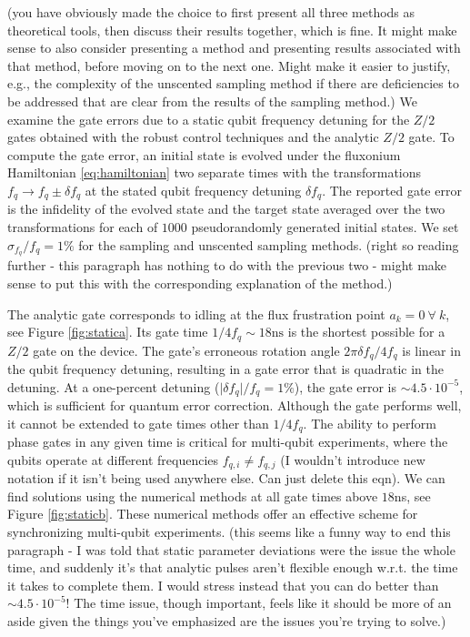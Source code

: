(you have obviously made the choice to first present all three methods as theoretical tools, then discuss their results together, which is fine. It might make sense to also consider presenting a method and presenting results associated with that method, before moving on to the next one. Might make it easier to justify, e.g., the complexity of the unscented sampling method if there are deficiencies to be addressed that are clear from the results of the sampling method.)
We examine the gate errors due to a static qubit frequency
detuning for the $Z/2$ gates obtained with the robust control techniques
and the analytic $Z/2$ gate.
To compute the gate error,
an initial state is evolved
under the fluxonium Hamiltonian \eqref{eq:hamiltonian}
two separate times with the transformations
$f_{q} \rightarrow f_{q} \pm \delta f_{q}$
at the stated qubit frequency detuning $\delta f_{q}$.
The reported gate error is the infidelity of
the evolved state and the target state averaged over
the two transformations for each of $1000$ pseudorandomly
generated initial states.
We set $\sigma_{f_{q}}/f_{q} = 1\%$
for the sampling and unscented sampling
methods.
(right so reading further - this paragraph has nothing to do with the previous two - might make sense to put this with the corresponding explanation of the method.)

The analytic gate corresponds to
idling at the flux frustration point $a_{k} = 0 \ \forall \ k$, see Figure
\ref{fig:statica}. Its gate time $1 / 4 f_{q} \sim 18\textrm{ns}$
is the shortest possible for a $Z/2$ gate on the device.
The gate's erroneous rotation angle
$2 \pi \delta f_{q} / 4 f_{q}$ is linear in the
qubit frequency detuning, resulting in a gate error that is quadratic
in the detuning.
At a one-percent
detuning ($\lvert \delta f_{q} \rvert / f_{q} = 1\%$),
the gate error is $\sim 4.5 \cdot 10^{-5}$,
which is sufficient for quantum error correction.
Although the gate performs well, it cannot be extended
to gate times other than
$1 / 4 f_{q}$. The ability to perform
phase gates in any given time is critical
for multi-qubit experiments, where the qubits operate at different
frequencies $f_{q, i} \neq f_{q, j}$ (I wouldn't introduce new notation if it isn't being used anywhere else. Can just delete this eqn).
We can find solutions using the numerical methods at
all gate times above $18$ns, see Figure \ref{fig:staticb}.
These numerical methods offer an effective scheme for synchronizing
multi-qubit experiments. (this seems like a funny way to end this paragraph - I was told that static parameter deviations were the issue the whole time, and suddenly it's that analytic pulses aren't flexible enough w.r.t. the time it takes to complete them. I would stress instead that you can do better than $\sim 4.5 \cdot 10^{-5}$! The time issue, though important, feels like it should be more of an aside given the things you've emphasized are the issues you're trying to solve.)

